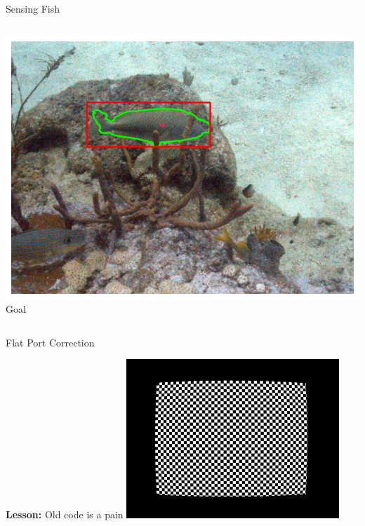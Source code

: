 \begin{frame}{Sensing Fish}
\begin{columns}
\begin{column}{0.33\textwidth}
            \includegraphics[width=\linewidth,keepaspectratio]{images/ideal.png}
            {\small Goal}
        \end{column}
    \end{columns}
\end{frame}

\begin{frame}{Flat Port Correction}
    \centering
    \item\textbf{Lesson:} Old code is a pain
    \includegraphics[width=0.6\textwidth,keepaspectratio]{images/remapped.jpg}
\end{frame}


